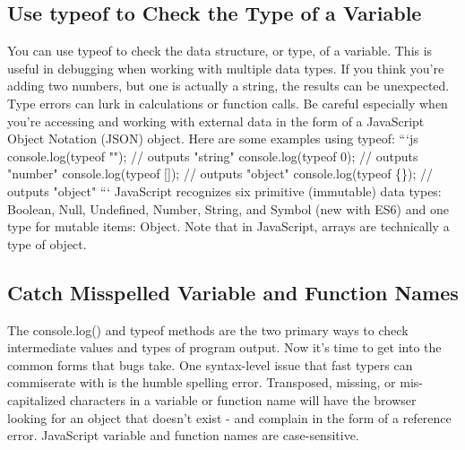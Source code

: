 \documentclass{article}%
\begin{document}
%
\subsection{Use typeof to Check the Type of a Variable}%
\label{subsec:UsetypeoftoChecktheTypeofaVariable}%
You can use typeof to check the data structure, or type, of a variable. This is useful in debugging when working with multiple data types. If you think you're adding two numbers, but one is actually a string, the results can be unexpected. Type errors can lurk in calculations or function calls. Be careful especially when you're accessing and working with external data in the form of a JavaScript Object Notation (JSON) object.\newline%
Here are some examples using typeof:\newline%
```js\newline%
console.log(typeof ""); // outputs "string"\newline%
console.log(typeof 0); // outputs "number"\newline%
console.log(typeof {[}{]}); // outputs "object"\newline%
console.log(typeof \{\}); // outputs "object"\newline%
```\newline%
JavaScript recognizes six primitive (immutable) data types: Boolean, Null, Undefined, Number, String, and Symbol (new with ES6) and one type for mutable items: Object. Note that in JavaScript, arrays are technically a type of object.\newline%

%
\subsection{Catch Misspelled Variable and Function Names}%
\label{subsec:CatchMisspelledVariableandFunctionNames}%
The console.log() and typeof methods are the two primary ways to check intermediate values and types of program output. Now it's time to get into the common forms that bugs take. One syntax{-}level issue that fast typers can commiserate with is the humble spelling error.\newline%
Transposed, missing, or mis{-}capitalized characters in a variable or function name will have the browser looking for an object that doesn't exist {-} and complain in the form of a reference error. JavaScript variable and function names are case{-}sensitive.\newline%

%
\end{document}
